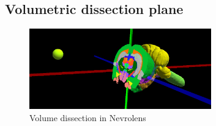 \subsection{Volumetric dissection plane}\label{chap:dissect}
\begin{figure}[ht]
    \centering
    \includegraphics[width=0.7\textwidth]{fig/volumdissectionoverview.png}
    \caption{Volume dissection in Nevrolens}
\end{figure}

